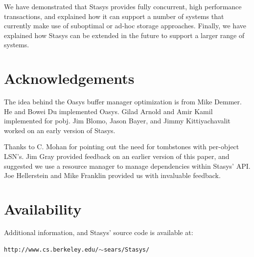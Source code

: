 \documentclass[letterpaper,twocolumn,10pt]{article}
\newcommand{\yad}{Stasys\xspace}
\newcommand{\yads}{Stasys'\xspace}
\newcommand{\oasys}{Oasys\xspace}
\begin{document}
We have demonstrated that \yad provides fully
concurrent, high performance transactions, and explained how it can
support a number of systems that currently make use of suboptimal or
ad-hoc storage approaches.  Finally, we have explained how \yad can be
extended in the future to support a larger range of systems.

\section{Acknowledgements}

The idea behind the \oasys buffer manager optimization is from Mike
Demmer.  He and Bowei Du implemented \oasys.  Gilad Arnold and Amir Kamil implemented
 for pobj.  Jim Blomo, Jason Bayer, and Jimmy
Kittiyachavalit worked on an early version of \yad.

Thanks to C. Mohan for pointing out the need for tombstones with
per-object LSN's.  Jim Gray provided feedback on an earlier version of
this paper, and suggested we use a resource manager to manage
dependencies within \yads API.  Joe Hellerstein and Mike Franklin
provided us with invaluable feedback.

\section{Availability}

Additional information, and \yads source code is available at:

\begin{center}
{\small{\tt http://www.cs.berkeley.edu/\ensuremath{\sim}sears/\yad/}}
\end{center}

{\footnotesize 
\nocite{*}
}

\theendnotes
\end{document}
